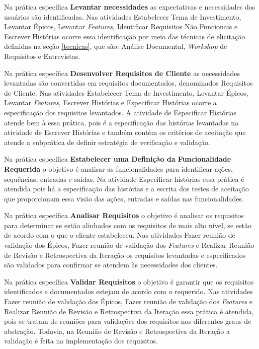 Na prática específica \textbf{Levantar necessidades} as expectativas e necessidades dos usuários
são identificadas. Nas atividades Estabelecer Tema de Investimento, Levantar Épicos, 
Levantar \textit{Features}, Identificar Requisitos Não Funcionais e Escrever Histórias ocorre 
essa identificação por meio das técnicas de elicitação definidas na seção \ref{tecnicas}, que são: Análise
Documental, \textit{Workshop} de Requisitos e Entrevistas.

Na prática específica \textbf{Desenvolver Requisitos de Cliente} as necessidades levantadas são
convertidas em requisitos documentados, denominados Requisitos de Cliente. Nas atividades Estabelecer Tema de Investimento, Levantar Épicos, 
Levantar \textit{Features}, Escrever Histórias e Especificar Histórias ocorre 
a especificação dos requisitos levantados. A atividade de Especificar Histórias
atende bem à essa prática, pois é a especificação das histórias levantadas na atividade
de Escrever Histórias e também contém os critérios de aceitação que atende a subprática
de definir estratégia de verificação e validação.

Na prática específica \textbf{Estabelecer uma Definição da Funcionalidade Requerida}
o objetivo é analisar as funcionalidades para identificar ações, sequências, entradas e saídas.
Na atividade Especificar histórias essa prática é atendida pois há a especificação
das histórias e a escrita dos testes de aceitação que proporcionam essa visão das ações,
entradas e saídas nas funcionalidades.

Na prática específica \textbf{Analisar Requisitos} o objetivo é analisar os requisitos
para determinar se estão alinhados com os requisitos de mais alto nível, se estão de acordo
com o que o cliente estabeleceu. Nas atividades Fazer reunião de validação dos Épicos,
Fazer reunião de validação dos \textit{Features} e Realizar Reunião de Revisão e Retrospectiva da Iteração
os requisitos levantadas e especificados são validados para confirmar se atendem às necessidades
dos clientes. 

Na prática específica \textbf{Validar Requisitos} o objetivo é garantir que os requisitos 
identificados e documentados estejam de acordo com o requerido. Nas atividades Fazer reunião de validação dos Épicos,
Fazer reunião de validação dos \textit{Features} e Realizar Reunião de Revisão e Retrospectiva da Iteração
essa prática é atendida, pois se tratam de reuniões para validações dos requisitos
nos diferentes graus de abstração. Todavia, na Reunião de Revisão e Retrospectiva da Iteração
a validação é feita na implementação dos requisitos.